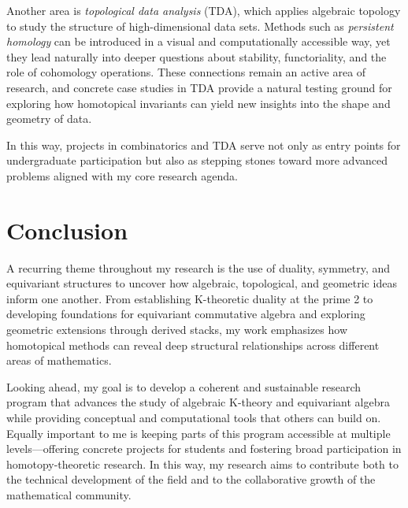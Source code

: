 \documentclass[11pt]{article}
\begin{document}
Another area is {\it topological data analysis} (TDA), which applies algebraic topology to study the structure of high-dimensional data sets.
Methods such as {\it persistent homology} can be introduced in a visual and computationally accessible way, yet they lead naturally into deeper questions about stability, functoriality, and the role of cohomology operations.
These connections remain an active area of research, and concrete case studies in TDA provide a natural testing ground for exploring how homotopical invariants can yield new insights into the shape and geometry of data.

In this way, projects in combinatorics and TDA serve not only as entry points for undergraduate participation but also as stepping stones toward more advanced problems aligned with my core research agenda.

\section{Conclusion}
A recurring theme throughout my research is the use of duality, symmetry, and equivariant structures to uncover how algebraic, topological, and geometric ideas inform one another. 
From establishing K-theoretic duality at the prime 2 to developing foundations for equivariant commutative algebra and exploring geometric extensions through derived stacks, my work emphasizes how homotopical methods can reveal deep structural relationships across different areas of mathematics.

Looking ahead, my goal is to develop a coherent and sustainable research program that advances the study of algebraic K-theory and equivariant algebra while providing conceptual and computational tools that others can build on. 
Equally important to me is keeping parts of this program accessible at multiple levels—offering concrete projects for students and fostering broad participation in homotopy-theoretic research. 
In this way, my research aims to contribute both to the technical development of the field and to the collaborative growth of the mathematical community.



\end{document}
